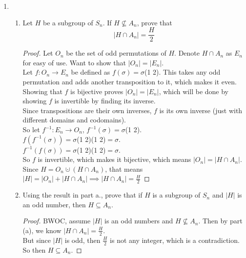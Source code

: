 \documentclass[12pt]{article}
\begin{document}
\begin{enumerate}
		\item
		\begin{enumerate}
			\item Let $H$ be a subgroup of $S_n$. If $H \nsubseteq A_n$, prove that \[|H \cap A_n| = \frac{H}{2}\]
			\begin{proof}
				Let $O_n$ be the set of odd permutations of $H$. Denote $H \cap A_n$ as $E_n$ for easy of use. Want to show that $|O_n| = |E_n|$.\\
				Let $f : O_n \rightarrow E_n$ be defined as $f(\sigma) = \sigma$(1 2). This takes any odd permutation and adds another transposition to it, which makes it even.\\
				Showing that $f$ is bijective proves $|O_n| = |E_n|$, which will be done by showing $f$ is invertible by finding its inverse.\\
				Since transpositions are their own inverses, $f$ is its own inverse (just with different domains and codomains).\\
				So let $f^{-1} : E_n \rightarrow O_n$, $f^{-1}(\sigma) = \sigma$(1 2).\\
				$f(f^{-1}(\sigma)) = \sigma$(1 2)(1 2)$ = \sigma$.\\
				$f^{-1}(f(\sigma)) = \sigma$(1 2)(1 2)$ = \sigma$.\\
				So $f$ is invertible, which makes it bijective, which means $|O_n| = |H \cap A_n|$. Since $H = O_n \cupdot (H \cap A_n)$, that means $|H| = |O_n|+|H \cap A_n| \implies |H \cap A_n|=\frac{H}{2}$
			\end{proof}
			\item Using the result in part a., prove that if $H$ is a subgroup of $S_n$ and $|H|$ is an odd number, then $H \subseteq A_n$.
			\begin{proof}
				BWOC, assume $|H|$ is an odd numbers and $H \nsubseteq A_n$. Then by part (a), we know $|H \cap A_n| = \frac{H}{2}$.\\
				But since $|H|$ is odd, then $\frac{H}{2}$ is not any integer, which is a contradiction.\\
				So then $H \subseteq A_n$.
			\end{proof}
		\end{enumerate}
	

\end{enumerate}
\end{document}
